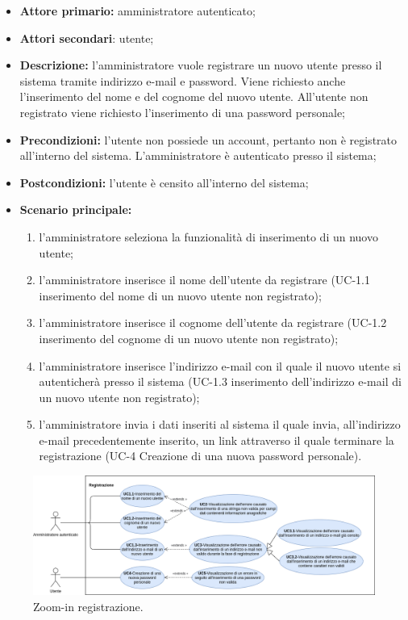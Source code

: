 \begin{itemize}
	\item \textbf{Attore primario:} amministratore autenticato;

	\item \textbf{Attori secondari}: utente;

	\item \textbf{Descrizione:} l'amministratore vuole registrare un nuovo utente presso il sistema tramite indirizzo e-mail e password. Viene richiesto anche l'inserimento del nome e del cognome del nuovo utente. All'utente non registrato viene richiesto l'inserimento di una password personale;

	\item \textbf{Precondizioni:} l'utente non possiede un account, pertanto non è registrato all'interno del sistema. L'amministratore è autenticato presso il sistema;

	\item \textbf{Postcondizioni:} l'utente è censito all'interno del sistema;

	\item \textbf{Scenario principale:}
	      \begin{enumerate}
		      \item l'amministratore seleziona la funzionalità di inserimento di un nuovo utente;
		      \item l'amministratore inserisce il nome dell'utente da registrare (UC-1.1 inserimento del nome di un nuovo utente non registrato);
		      \item l'amministratore inserisce il cognome dell'utente da registrare (UC-1.2 inserimento del cognome di un nuovo utente non registrato);
		      \item l'amministratore inserisce l'indirizzo e-mail con il quale il nuovo utente si autenticherà presso il sistema (UC-1.3 inserimento dell'indirizzo e-mail di un nuovo utente non registrato);
		      \item l'amministratore invia i dati inseriti al sistema il quale invia, all'indirizzo e-mail precedentemente inserito, un link attraverso il quale terminare la registrazione (UC-4 Creazione di una nuova password personale).
	      \end{enumerate}
\end{itemize}

\begin{figure}[H]
	\centering
	  \includegraphics[width=\textwidth]{src/CasiDUso/immagini/SottocasiRegistrazione.png}
	\caption{Zoom-in registrazione.}
  \end{figure}

